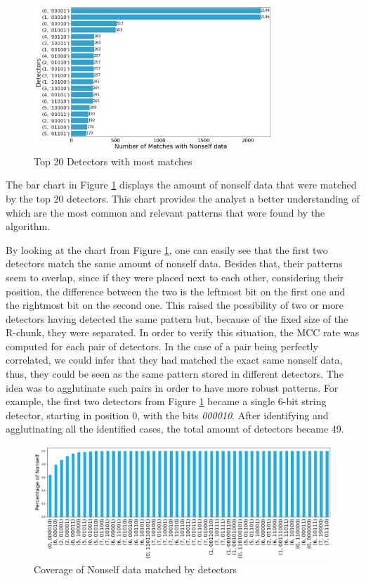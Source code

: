 \begin{figure}[]
	\centering
	\includegraphics[width=0.8\textwidth, keepaspectratio]{img/matches_by_detector_rdz.png}
	\caption{Top 20 Detectors with most matches}
	\label{fig:ev_det_match}
\end{figure}

The bar chart in Figure \ref{fig:ev_det_match} displays the amount of nonself data that were matched by the top 20 detectors. This chart provides the analyst a better understanding of which are the most common and relevant patterns that were found by the algorithm.

By looking at the chart from Figure \ref{fig:ev_det_match}, one can easily see that the first two detectors match the same amount of nonself data. Besides that, their patterns seem to overlap, since if they were placed next to each other, considering their position, the difference between the two is the leftmost bit on the first one and the rightmost bit on the second one. This raised the possibility of two or more detectors having detected the same pattern but, because of the fixed size of the R-chunk, they were separated. In order to verify this situation, the MCC rate was computed for each pair of detectors. In the case of a pair being perfectly correlated, we could infer that they had matched the exact same nonself data, thus, they could be seen as the same pattern stored in different detectors. The idea was to agglutinate such pairs in order to have more robust patterns. For example, the first two detectors from Figure \ref{fig:ev_det_match} became a single 6-bit string detector, starting in position 0, with the bits \textit{000010}. After identifying and agglutinating all the identified cases, the total amount of detectors became 49.

\begin{figure}[]
	\centering
	\includegraphics[width=\textwidth, keepaspectratio]{img/det_coverage.png}
	\caption{Coverage of Nonself data matched by detectors}
	\label{fig:ev_det_cov}
\end{figure}

